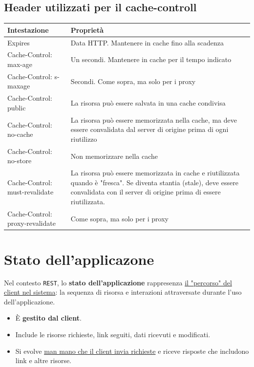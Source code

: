 \subsection{Header utilizzati per il cache-controll}
\begin{table}[H]
\centering
\begin{tabularx}{\textwidth}{|l|X|}
\hline
\textbf{Intestazione} & \textbf{Proprietà} \\ \hline
Expires & Data HTTP. Mantenere in cache fino alla scadenza \\ \hline
Cache-Control: max-age & Un secondi. Mantenere in cache per il tempo indicato \\ \hline
Cache-Control: s-maxage & Secondi. Come sopra, ma solo per i proxy \\ \hline
Cache-Control: public & La risorsa può essere salvata in una cache condivisa \\ \hline
Cache-Control: no-cache & La risorsa può essere memorizzata nella cache, ma deve essere convalidata dal server di origine prima di ogni riutilizzo \\ \hline
Cache-Control: no-store & Non memorizzare nella cache \\ \hline
Cache-Control: must-revalidate & La risorsa può essere memorizzata in cache e riutilizzata quando è "fresca". Se diventa stantia (stale), deve essere convalidata con il server di origine prima di essere riutilizzata. \\ \hline
Cache-Control: proxy-revalidate & Come sopra, ma solo per i proxy \\ \hline
\end{tabularx}
\end{table}

\section{Stato dell'applicazone}
Nel contesto \texttt{REST}, lo \textbf{stato dell'applicazione} rappresenza \uline{il "percorso" del client nel sistema}: la sequenza di risorsa e interazioni attraversate durante l'uso dell'applicazione.

\begin{itemize}
    \item È \textbf{gestito dal client}.
    \item Include le risorse richieste, link seguiti, dati ricevuti e modificati.
    \item Si evolve \uline{man mano che il client invia richieste} e riceve risposte che includono link e altre risorse.
\end{itemize}


